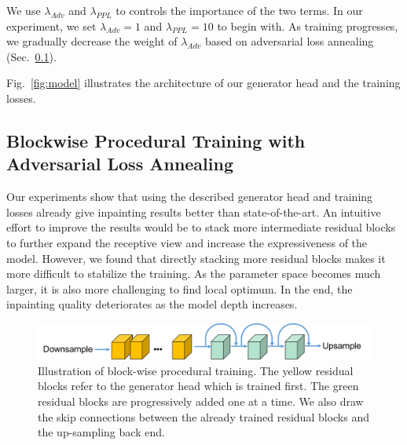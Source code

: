 We use $\lambda_{Adv}$ and $\lambda_{PPL}$ to controls the importance of the two terms. In our experiment, we set $\lambda_{Adv}=1$ and $\lambda_{PPL}=10$ to begin with. As training progresses, we gradually decrease the weight of $\lambda_{Adv}$ based on adversarial loss annealing (Sec.~\ref{sec:procedural}).

Fig.~\ref{fig:model} illustrates the architecture of our generator head and the training losses.

\subsection{Blockwise Procedural Training with Adversarial Loss Annealing}
\label{sec:procedural}
Our experiments show that using the described generator head and training losses already give inpainting results better than state-of-the-art. An intuitive effort to improve the results would be to stack more intermediate residual blocks to further expand the receptive view and increase the expressiveness of the model. However, we found that directly stacking more residual blocks makes it more difficult to stabilize the training. As the parameter space becomes much larger, it is also more challenging to find local optimum. In the end, the inpainting quality deteriorates as the model depth increases.

\begin{figure}[t]
\centering
\small
\includegraphics[width=1\textwidth]{figures/proc.pdf}
\caption{Illustration of block-wise procedural training. The yellow residual blocks refer to the generator head which is trained first. The green residual blocks are progressively added one at a time. We also draw the skip connections between the already trained residual blocks and the up-sampling back end.}
\label{fig:proc}
\vspace{-20pt}
\end{figure}

